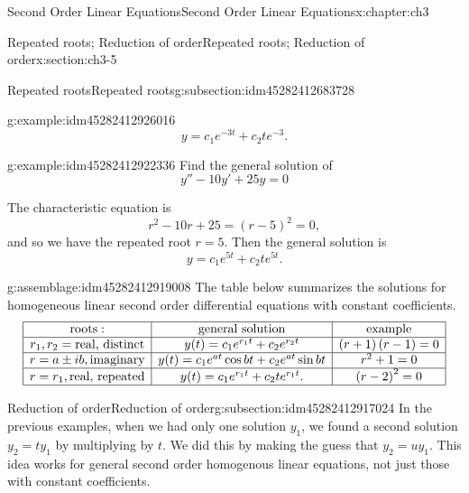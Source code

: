 \documentclass[oneside,10pt,]{book}
\numberwithin{equation}{section}
\numberwithin{equation}{section}
\newcommand{\amp}{&}
\begin{document}
\begin{chapterptx}{Second Order Linear Equations}{}{Second Order Linear Equations}{}{}{x:chapter:ch3}
\begin{sectionptx}{Repeated roots; Reduction of order}{}{Repeated roots; Reduction of order}{}{}{x:section:ch3-5}
\begin{subsectionptx}{Repeated roots}{}{Repeated roots}{}{}{g:subsection:idm45282412683728}
\begin{example}{}{g:example:idm45282412926016}
\begin{equation*}
y = c_1 e^{-3t} + c_2 t e^{-3}.
\end{equation*}
%
\end{example}
\begin{example}{}{g:example:idm45282412922336}%
Find the general solution of%
\begin{equation*}
y'' - 10 y' + 25 y = 0
\end{equation*}
%
\par
The characteristic equation is%
\begin{equation*}
r^2 - 10 r + 25 = (r - 5)^2 = 0,
\end{equation*}
and so we have the repeated root \(r = 5\). Then the general solution is%
\begin{equation*}
y = c_1 e^{5t} + c_2 te^{5t}.
\end{equation*}
%
\end{example}
\begin{assemblage}{}{g:assemblage:idm45282412919008}%
The table below summarizes the solutions for homogeneous linear second order differential equations with constant coefficients.%
\begin{equation*}
\begin{array}{|c|c|c|}
\hline
\text{roots}: \amp \text{general solution} \amp \text{example}\\
\hline
r_{1},r_{2}= \text{real, distinct} \amp y(t)=c_{1}e^{r_{1}t}+c_{2}e^{r_{2}t} \amp \left(r+1\right)\left(r-1\right)=0 \\
\hline
r=a\pm ib,\text{imaginary} \amp y(t)=c_{1}e^{a t}\cos b t+c_{2}e^{a t}\sin b t \amp r^{2}+1=0\\
\hline
r=r_{1},\text{real, repeated} \amp y(t)=c_{1}e^{r_{1}t}+c_{2}te^{r_{1}t}. \amp \left(r-2\right)^{2}=0\\
\hline
\end{array}
\end{equation*}
%
\end{assemblage}
\end{subsectionptx}
%
%
\typeout{************************************************}
\typeout{************************************************}
%
\begin{subsectionptx}{Reduction of order}{}{Reduction of order}{}{}{g:subsection:idm45282412917024}
In the previous examples, when we had only one solution \(y_{1}\), we found a second solution \(y_{2}=ty_{1}\) by multiplying by \(t\). We did this by making the guess that \(y_2 = u y_1\). This idea works for general second order homogenous linear equations, not just those with constant coefficients.%

\end{subsectionptx}
\end{sectionptx}
\end{chapterptx}
\end{document}
